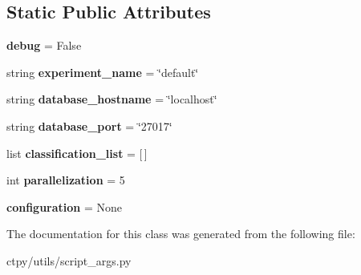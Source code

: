 \subsection*{Static Public Attributes}
\begin{DoxyCompactItemize}
\item 
\hypertarget{classctpy_1_1utils_1_1script__args_1_1_script_args_af8bc17ca882862f169e6aee8d37fb345}{{\bfseries debug} = False}\label{classctpy_1_1utils_1_1script__args_1_1_script_args_af8bc17ca882862f169e6aee8d37fb345}

\item 
\hypertarget{classctpy_1_1utils_1_1script__args_1_1_script_args_a241e38cac36cd44efdb406c71e1f5b79}{string {\bfseries experiment\-\_\-name} = \char`\"{}default\char`\"{}}\label{classctpy_1_1utils_1_1script__args_1_1_script_args_a241e38cac36cd44efdb406c71e1f5b79}

\item 
\hypertarget{classctpy_1_1utils_1_1script__args_1_1_script_args_a0f9df5a18b78baaba90299af4a629c91}{string {\bfseries database\-\_\-hostname} = \char`\"{}localhost\char`\"{}}\label{classctpy_1_1utils_1_1script__args_1_1_script_args_a0f9df5a18b78baaba90299af4a629c91}

\item 
\hypertarget{classctpy_1_1utils_1_1script__args_1_1_script_args_a7f2ddcc4e3fd25b29e8456d871e5df71}{string {\bfseries database\-\_\-port} = \char`\"{}27017\char`\"{}}\label{classctpy_1_1utils_1_1script__args_1_1_script_args_a7f2ddcc4e3fd25b29e8456d871e5df71}

\item 
\hypertarget{classctpy_1_1utils_1_1script__args_1_1_script_args_a8f943aaed17c05687c6c82f3f77743d4}{list {\bfseries classification\-\_\-list} = \mbox{[}$\,$\mbox{]}}\label{classctpy_1_1utils_1_1script__args_1_1_script_args_a8f943aaed17c05687c6c82f3f77743d4}

\item 
\hypertarget{classctpy_1_1utils_1_1script__args_1_1_script_args_adfd6a8c7df43fe35add1692f42a0b44d}{int {\bfseries parallelization} = 5}\label{classctpy_1_1utils_1_1script__args_1_1_script_args_adfd6a8c7df43fe35add1692f42a0b44d}

\item 
\hypertarget{classctpy_1_1utils_1_1script__args_1_1_script_args_a0484dd6c11a41205161489e07d0a673f}{{\bfseries configuration} = None}\label{classctpy_1_1utils_1_1script__args_1_1_script_args_a0484dd6c11a41205161489e07d0a673f}

\end{DoxyCompactItemize}


The documentation for this class was generated from the following file\-:\begin{DoxyCompactItemize}
\item 
ctpy/utils/script\-\_\-args.\-py\end{DoxyCompactItemize}
